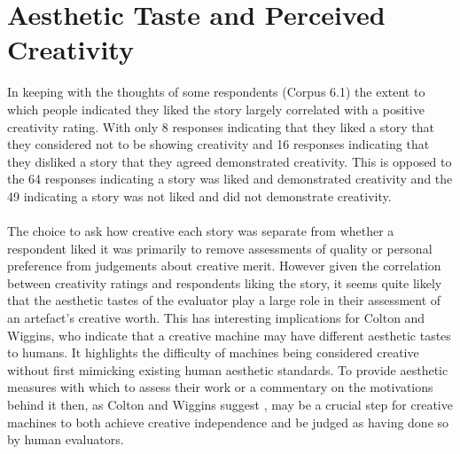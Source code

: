 \documentclass[letterpaper]{article}
\begin{document}
\section{Aesthetic Taste and Perceived Creativity} \label{sec:aesthetics}
In keeping with the thoughts of some respondents (Corpus 6.1) the extent to which people indicated they liked the story largely correlated with a positive creativity rating. With only 8 responses indicating that they liked a story that they considered not to be showing creativity and 16 responses indicating that they disliked a story that they agreed demonstrated creativity. This is opposed to the 64 responses indicating a story was liked and demonstrated creativity and the 49 indicating a story was not liked and did not demonstrate creativity.\\
\\The choice to ask how creative each story was separate from whether a respondent liked it was primarily to remove assessments of quality or personal preference from judgements about creative merit. However given the correlation between creativity ratings and respondents liking the story, it seems quite likely that the aesthetic tastes of the evaluator play a large role in their assessment of an artefact's creative worth. This has interesting implications for Colton and Wiggins, who indicate that a creative machine may have different aesthetic tastes to humans. It highlights the difficulty of machines being considered creative without first mimicking existing human aesthetic standards. To provide aesthetic measures with which to assess their work or a commentary on the motivations behind it then, as Colton and Wiggins suggest , may be a crucial step for creative machines to both achieve creative independence and be judged as having done so by human evaluators.
\end{document}
